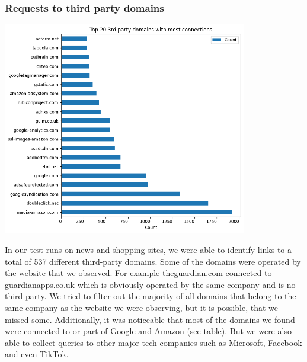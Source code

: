 \subsubsection{Requests to third party domains}
\includegraphics[width=0.8\textwidth]{./assets/top20thirdpartydomains.png}

In our test runs on news and shopping sites, we were able to identify links to a total of 537 different third-party domains. Some of the domains were operated by the website that we observed. For example theguardian.com connected to guardianapps.co.uk which is obviously operated by the same company and is no third party. We tried to filter out the majority of all domains that belong to the same company as the website we were observing, but it is possible, that we missed some. Additionally, it was noticeable that most of the domains we found were connected to or part of Google and Amazon (see table). But we were also able to collect queries to other major tech companies such as Microsoft, Facebook and even TikTok. 

